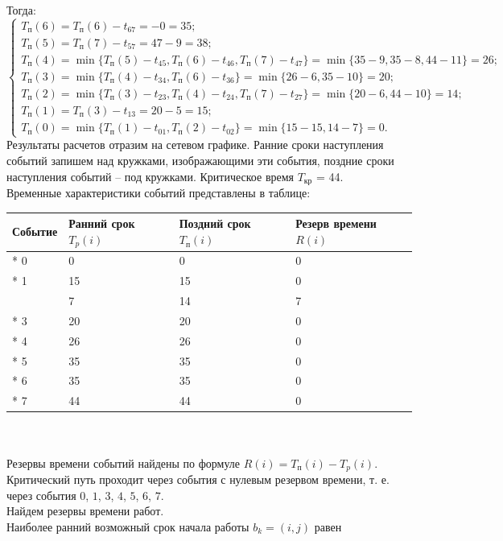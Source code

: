 \documentclass[a4paper, 12pt]{report}
\begin{document}
	Тогда:
	$$
	\begin{cases}
	T_\text{п}(6)=T_\text{п}(6)-t_{67}=-0=35;\\
	T_\text{п}(5)=T_\text{п}(7)-t_{57}=47-9=38;\\
	T_\text{п}(4)=\min\{T_\text{п}(5)-t_{45},T_\text{п}(6)-t_{46},T_\text{п}(7)-t_{47}\}=\min\{35-9, 35-8, 44-11\}=26;\\
	T_\text{п}(3)=\min\{T_\text{п}(4)-t_{34}, T_\text{п}(6)-t_{36}\}=\min\{26-6, 35-10\}=20;\\
	T_\text{п}(2)=\min\{T_\text{п}(3)-t_{23}, T_\text{п}(4)-t_{24}, T_\text{п}(7)-t_{27}\}=\min\{20-6, 44-10\}=14;\\
	T_\text{п}(1)=T_\text{п}(3)-t_{13}=20-5=15;\\
	T_\text{п}(0)=\min\{T_\text{п}(1)-t_{01},T_\text{п}(2)-t_{02}\}=\min\{15-15, 14-7\}=0.
	\end{cases}
	$$
	Результаты расчетов отразим на сетевом графике. Ранние сроки
	наступления событий запишем над кружками, изображающими эти
	события, поздние сроки наступления событий -- под кружками.
	Критическое время $T_\text{кр}$ = 44.\\
	Временные характеристики событий представлены в таблице: \\
	\begin{tabular}{ |p{3cm}||p{3cm}||p{3cm}||p{3cm}|  }
		\hline
		Событие & Ранний срок $T_p(i)$ & Поздний срок $T_\text{п}(i)$ & Резерв времени $R(i)$\\
		\hline
		* 0 & 0 & 0 & 0\\
		* 1 & 15 & 15 & 0\\
		\;\;\;2 & 7 & 14 & 7\\
		* 3 & 20 & 20 & 0\\
		* 4 & 26 & 26 & 0\\
		* 5 & 35 & 35 & 0\\
		* 6 & 35 & 35 & 0\\
		* 7 & 44 & 44 & 0\\
		\hline
	\end{tabular}\\\\
	Резервы времени событий найдены по формуле $R(i)=T_\text{п}(i)-T_p(i)$.\\
	Критический путь проходит через события с нулевым резервом
	времени, т. е. через события $0$, $1$, $3$, $4$, $5$, $6$, $7$.\\
	Найдем резервы времени работ.\\
	Наиболее ранний возможный срок начала работы $b_k = (i, j)$ равен
\end{document}
